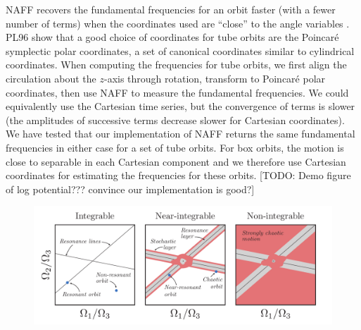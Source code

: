 \documentclass[letterpaper,12pt,preprint]{aastex}
\begin{document}
NAFF recovers the fundamental frequencies for an orbit faster (with a fewer number of terms) when the coordinates used are ``close'' to the angle variables \cite[PL96;][]{papaphilippou96}. PL96 show that a good choice of coordinates for tube orbits are the Poincar\'e symplectic polar coordinates, a set of canonical coordinates similar to cylindrical coordinates. When computing the frequencies for tube orbits, we first align the circulation about the $z$-axis through rotation, transform to Poincar\'e polar coordinates, then use NAFF to measure the fundamental frequencies. We could equivalently use the Cartesian time series, but the convergence of terms is slower (the amplitudes of successive terms decrease slower for Cartesian coordinates). We have tested that our implementation of NAFF returns the same fundamental frequencies in either case for a set of tube orbits. For box orbits, the motion is close to separable in each Cartesian component and we therefore use Cartesian coordinates for estimating the frequencies for these orbits. [TODO: Demo figure of log potential??? convince our implementation is good?]

\begin{figure}[!p]
\begin{center}
\includegraphics[width=\textwidth]{figures/cartoons.pdf}
\caption{} 
\label{fig:cartoons}
\end{center}
\end{figure}
\end{document}

